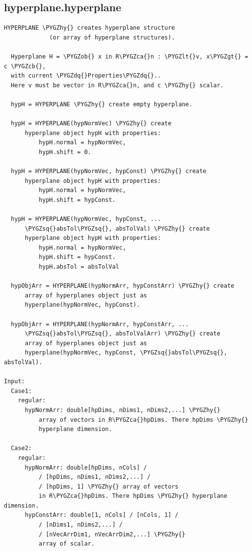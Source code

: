 \documentclass[letterpaper,10pt,english]{sphinxmanual}
\def\PYGZob{\char`\{}
\def\PYGZcb{\char`\}}
\def\PYGZca{\char`\^}
\def\PYGZlt{\char`\<}
\def\PYGZgt{\char`\>}
\def\PYGZhy{\char`\-}
\def\PYGZsq{\char`\'}
\def\PYGZdq{\char`\"}
\begin{document}
\subsection{hyperplane.hyperplane}
\label{chap_functions:hyperplane-hyperplane}
\begin{Verbatim}[commandchars=\\\{\}]
HYPERPLANE \PYGZhy{} creates hyperplane structure
             (or array of hyperplane structures).

  Hyperplane H = \PYGZob{} x in R\PYGZca{}n : \PYGZlt{}v, x\PYGZgt{} = c \PYGZcb{},
  with current \PYGZdq{}Properties\PYGZdq{}..
  Here v must be vector in R\PYGZca{}n, and c \PYGZhy{} scalar.

  hypH = HYPERPLANE \PYGZhy{} create empty hyperplane.

  hypH = HYPERPLANE(hypNormVec) \PYGZhy{} create
      hyperplane object hypH with properties:
          hypH.normal = hypNormVec,
          hypH.shift = 0.

  hypH = HYPERPLANE(hypNormVec, hypConst) \PYGZhy{} create
      hyperplane object hypH with properties:
          hypH.normal = hypNormVec,
          hypH.shift = hypConst.

  hypH = HYPERPLANE(hypNormVec, hypConst, ...
      \PYGZsq{}absTol\PYGZsq{}, absTolVal) \PYGZhy{} create
      hyperplane object hypH with properties:
          hypH.normal = hypNormVec,
          hypH.shift = hypConst.
          hypH.absTol = absTolVal

  hypObjArr = HYPERPLANE(hypNormArr, hypConstArr) \PYGZhy{} create
      array of hyperplanes object just as
      hyperplane(hypNormVec, hypConst).

  hypObjArr = HYPERPLANE(hypNormArr, hypConstArr, ...
      \PYGZsq{}absTol\PYGZsq{}, absTolValArr) \PYGZhy{} create
      array of hyperplanes object just as
      hyperplane(hypNormVec, hypConst, \PYGZsq{}absTol\PYGZsq{}, absTolVal).

Input:
  Case1:
    regular:
      hypNormArr: double[hpDims, nDims1, nDims2,...] \PYGZhy{}
          array of vectors in R\PYGZca{}hpDims. There hpDims \PYGZhy{}
          hyperplane dimension.

  Case2:
    regular:
      hypNormArr: double[hpDims, nCols] /
          / [hpDims, nDims1, nDims2,...] /
          / [hpDims, 1] \PYGZhy{} array of vectors
          in R\PYGZca{}hpDims. There hpDims \PYGZhy{} hyperplane dimension.
      hypConstArr: double[1, nCols] / [nCols, 1] /
          / [nDims1, nDims2,...] /
          / [nVecArrDim1, nVecArrDim2,...] \PYGZhy{}
          array of scalar.


\end{Verbatim}
\end{document}
